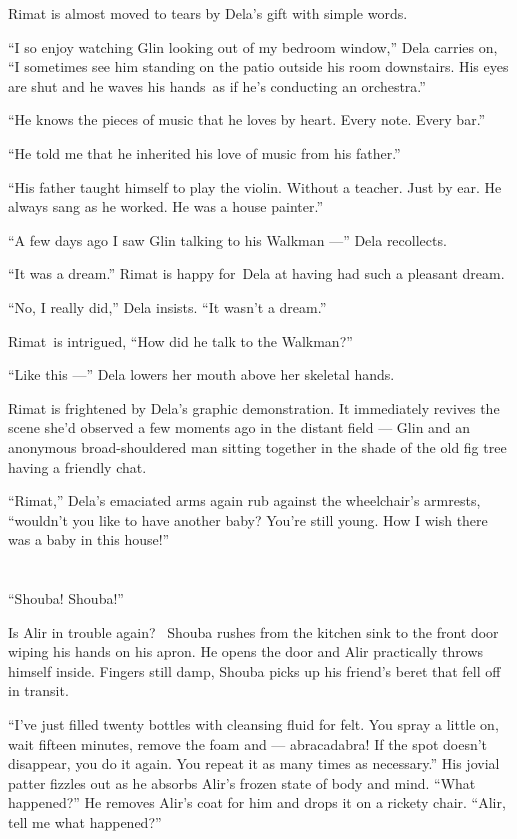 \documentclass[twoside,11pt,openany]{book}
\begin{document}
Rimat is almost moved to tears by Dela's gift with simple words.

``I so enjoy watching Glin looking out of my bedroom window,'' Dela carries on,
``I sometimes see him standing on the patio outside his room downstairs. His eyes are shut and he waves
his hands~as if he's conducting an orchestra.''

``He knows the pieces of music that he loves by heart. Every note. Every bar.''

``He told me that he inherited his love of music from his father.''

``His father taught himself to play the violin. Without a teacher. Just by ear. He always sang as he
worked. He was a house painter.''

``A few days ago I saw Glin talking to his Walkman ---'' Dela recollects.

``It was a dream.'' Rimat is happy for~Dela at having had such a pleasant dream.

``No, I really did,'' Dela insists. ``It wasn't a dream.''

Rimat~is intrigued, ``How did he talk to the Walkman?''

``Like this ---'' Dela lowers her mouth above her skeletal hands.

Rimat is frightened by Dela's graphic demonstration. It immediately revives the scene she'd observed a few moments ago
in the distant field --- Glin and an anonymous broad-shouldered man sitting together in the shade of the old fig tree
having a friendly chat.

``Rimat,'' Dela's emaciated arms again rub against the wheelchair's armrests,
``wouldn't you like to have another baby? You're still young. How I wish there was a baby in this
house!''


\bigskip

\chapter{}

``Shouba! Shouba!''

Is Alir in trouble again?~ Shouba rushes from the kitchen sink to the front door wiping his hands on his apron. He opens
the door and Alir practically throws himself inside. Fingers still damp, Shouba picks up his friend's beret that fell
off in transit.

``I've just filled twenty bottles with cleansing fluid for felt. You spray a little on, wait fifteen
minutes, remove the foam and --- abracadabra! If the spot doesn't disappear, you do it again. You repeat it as many times
as necessary.'' His jovial patter fizzles out as he absorbs Alir's frozen state of body and mind.
``What happened?'' He removes Alir's coat for him and drops it on a rickety
chair.  ``Alir, tell me what happened?''
\end{document}
